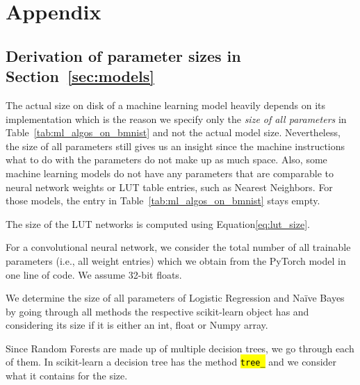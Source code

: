 \appendix

\section{Appendix}

\subsection{Derivation of parameter sizes in Section~\ref{sec:models}} \label{app:size}
The actual size on disk of a machine learning model heavily depends on its implementation which is the reason we specify only the \textit{size of all parameters} in Table~\ref{tab:ml_algos_on_bmnist} and not the actual model size. Nevertheless, the size of all parameters still gives us an insight since the machine instructions what to do with the parameters do not make up as much space. Also, some machine learning models do not have any parameters that are comparable to neural network weights or LUT table entries, such as Nearest Neighbors. For those models, the entry in Table~\ref{tab:ml_algos_on_bmnist} stays empty.

The size of the LUT networks is computed using Equation\ref{eq:lut_size}.

For a convolutional neural network, we consider the total number of all trainable parameters (i.e., all weight entries) which we obtain from the PyTorch model in one line of code. We assume 32-bit floats.

We determine the size of all parameters of Logistic Regression and Naïve Bayes by going through all methods the respective scikit-learn object has and considering its size if it is either an int, float or Numpy array.

Since Random Forests are made up of multiple decision trees, we go through each of them. In scikit-learn a decision tree has the method \hl{\texttt{tree\_}} and we consider what it contains for the size.

